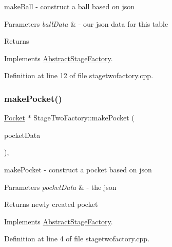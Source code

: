 make\+Ball -\/ construct a ball based on json 


\begin{DoxyParams}{Parameters}
{\em ball\+Data} & -\/ our json data for this table \\
\hline
\end{DoxyParams}
\begin{DoxyReturn}{Returns}

\end{DoxyReturn}


Implements \mbox{\hyperlink{class_abstract_stage_factory_a23367d64366e679aaff865620f5ce1ab}{Abstract\+Stage\+Factory}}.



Definition at line 12 of file stagetwofactory.\+cpp.

\mbox{\label{class_stage_two_factory_a6b66c413691103cf5df2840bcdb683ef}} 
\subsubsection{\texorpdfstring{make\+Pocket()}{makePocket()}}
{\footnotesize\ttfamily \mbox{\hyperlink{class_pocket}{Pocket}} $\ast$ Stage\+Two\+Factory\+::make\+Pocket (\begin{DoxyParamCaption}\item[{const Q\+Json\+Object \&}]{pocket\+Data }\end{DoxyParamCaption})\hspace{0.3cm}{\ttfamily [override]}, {\ttfamily [virtual]}}



make\+Pocket -\/ construct a pocket based on json 


\begin{DoxyParams}{Parameters}
{\em pocket\+Data} & -\/ the json \\
\hline
\end{DoxyParams}
\begin{DoxyReturn}{Returns}
newly created pocket 
\end{DoxyReturn}


Implements \mbox{\hyperlink{class_abstract_stage_factory_a6ce57859e00b135049e3b995b7dfc94d}{Abstract\+Stage\+Factory}}.



Definition at line 4 of file stagetwofactory.\+cpp.

